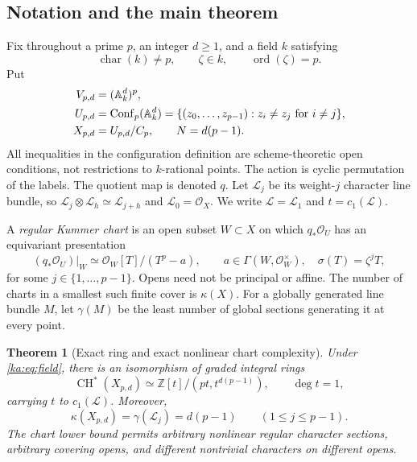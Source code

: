 \documentclass[11pt,a4paper]{article}
\newtheorem{theorem}{Theorem}[section]
\theoremstyle{definition}
\theoremstyle{remark}
\newcommand{\Z}{\mathbb Z}
\newcommand{\charac}{\operatorname{char}}
\newcommand{\A}{\mathbb A}
\newcommand{\OO}{\mathcal O}
\newcommand{\LL}{\mathcal L}
\newcommand{\CH}{\operatorname{CH}}
\newcommand{\Conf}{\operatorname{Conf}}
\newcommand{\ord}{\operatorname{ord}}
\newcommand{\atlas}{\kappa}
\newcommand{\gen}{\gamma}
\begin{document}
\subsection{Notation and the main theorem}
Fix throughout a prime $p$, an integer $d\geq1$, and a field $k$ satisfying
\begin{equation}
 \charac(k)\neq p,\qquad \zeta\in k,\qquad \ord(\zeta)=p.
 \label{ka:eq:field}
\end{equation}
Put
\begin{align}
 V_{p,d}&=(\A_k^d)^p,\notag\\
 U_{p,d}&=\Conf_p(\A_k^d)
   =\{(z_0,\ldots,z_{p-1}):z_i\neq z_j\text{ for }i\neq j\},\notag\\
 X_{p,d}&=U_{p,d}/C_p,\qquad N=d(p-1).
 \label{ka:eq:spaces}
\end{align}
All inequalities in the configuration definition are scheme-theoretic
open conditions, not restrictions to $k$-rational points. The action is
cyclic permutation of the labels. The quotient map is denoted $q$.
Let $\LL_j$ be its weight-$j$ character line bundle, so
$\LL_j\otimes\LL_h\simeq\LL_{j+h}$ and $\LL_0=\OO_X$.
We write $\LL=\LL_1$ and $t=c_1(\LL)$.

A \emph{regular Kummer chart} is an open subset $W\subset X$ on which
$q_*\OO_U$ has an equivariant presentation
\[
 (q_*\OO_U)|_W\simeq\OO_W[T]/(T^p-a),\qquad
 a\in\Gamma(W,\OO_W^\times),\quad \sigma(T)=\zeta^jT,
\]
for some $j\in\{1,\ldots,p-1\}$. Opens need not be principal or affine.
The number of charts in a smallest such finite cover is $\atlas(X)$.
For a globally generated line bundle $M$, let $\gen(M)$ be the least
number of global sections generating it at every point.

\begin{theorem}[Exact ring and exact nonlinear chart complexity]
\label{ka:thm:main}
Under \eqref{ka:eq:field}, there is an isomorphism of graded integral rings
\begin{equation}
 \CH^*(X_{p,d})\simeq\Z[t]/(pt,t^{d(p-1)}),\qquad \deg t=1,
 \label{ka:eq:mainring}
\end{equation}
carrying $t$ to $c_1(\LL)$. Moreover,
\begin{equation}
 \atlas(X_{p,d})=\gen(\LL_j)=d(p-1)
 \qquad (1\leq j\leq p-1).
 \label{ka:eq:maincounts}
\end{equation}
The chart lower bound permits arbitrary nonlinear regular character
sections, arbitrary covering opens, and different nontrivial characters
on different opens.
\end{theorem}
\end{document}
